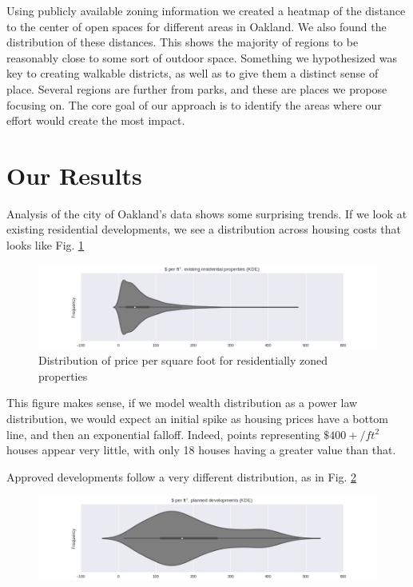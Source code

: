 \documentclass[]{report}
\begin{document}
	Using publicly available zoning information we created a heatmap of the distance to the center of open spaces for different areas in Oakland. We also found the distribution of these distances. This shows the majority of regions to be reasonably close to some sort of outdoor space. Something we hypothesized was key to creating walkable districts, as well as to give them a distinct sense of place. Several regions are further from parks, and these are places we propose focusing on. The core goal of our approach is to identify the areas where our effort would create the most impact. 
	
	\section{Our Results}
	Analysis of the city of Oakland's data shows some surprising trends. If we look at existing residential developments, we see a distribution across housing costs that looks like Fig. \ref{fig:residential-kde}
	\begin{figure}[H]
		\centering
		\includegraphics[width=\linewidth]{"img/residential KDE"}
		\caption{Distribution of price per square foot for residentially zoned properties}
		\label{fig:residential-kde}
	\end{figure}
	This figure makes sense, if we model wealth distribution as a power law distribution, we would expect an initial spike as housing prices have a bottom line, and then an exponential falloff. Indeed, points representing $\$400+/ft^2$ houses appear very little, with only 18 houses having a greater value than that.
	
	
	Approved developments follow a very different distribution, as in Fig. \ref{fig:planned-kde}
	
	\begin{figure}[H]
		\centering
		\includegraphics[width=\linewidth]{"img/planned KDE"}
		\caption{}
		\label{fig:planned-kde}
	\end{figure}
	
\end{document}
